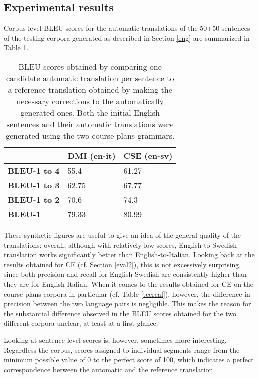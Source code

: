 \subsection{Experimental results} \label{res5}
Corpus-level BLEU scores for the automatic translations of the 50+50 sentences of the testing corpora generated as described in Section \ref{eng} are summarized in Table \ref{tbleu}.

\begin{table}[h]
    \centering
    \begin{tabular}{|l|l|l|}
    \hline
    \textbf{}            & \textbf{DMI (en-it)} & \textbf{CSE (en-sv)} \\ \hline
    \textbf{BLEU-1 to 4} & 55.4          & 61.27         \\ \hline
    \textbf{BLEU-1 to 3} & 62.75         & 67.77         \\ \hline
    \textbf{BLEU-1 to 2} & 70.6          & 74.3          \\ \hline
    \textbf{BLEU-1}      & 79.33         & 80.99         \\ \hline
    \end{tabular}
    \caption[BLEU scores for automatic translations based on the course plans grammars]{BLEU scores obtained by comparing one candidate automatic translation per sentence to a reference translation obtained by making the necessary corrections to the automatically generated ones. Both the initial English sentences and their automatic translations were generated using the two course plans grammars.}
    \label{tbleu}
    \end{table}

These synthetic figures are useful to give an idea of the general quality of the translations: overall, although with relatively low scores, English-to-Swedish translation works significantly better than English-to-Italian. 
Looking back at the results obtained for CE (cf. Section \ref{eval2}), this is not excessively surprising, since both precision and recall for English-Swedish are consistently higher than they are for English-Italian. 
When it comes to the results obtained for CE on the course plans corpora in particular (cf. Table \ref{tcereal}), however, the difference in precision between the two language pairs is negligible.
This makes the reason for the substantial difference observed in the BLEU scores obtained for the two different corpora unclear, at least at a first glance.\smallskip

Looking at sentence-level scores is, however, sometimes more interesting. 
Regardless the corpus, scores assigned to individual segments range from the minimum possible value of 0 to the perfect score of 100, which indicates a perfect correspondence between the automatic and the reference translation. \smallskip

